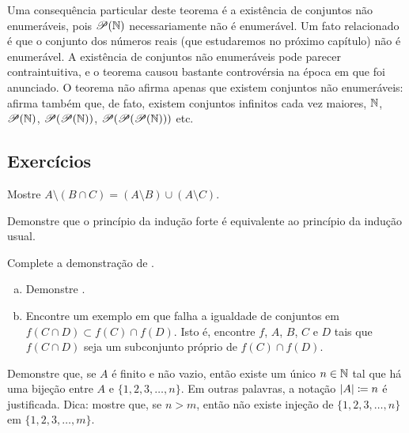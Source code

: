 Uma consequência particular deste teorema é a existência de conjuntos não
enumeráveis, pois ${\mathscr{P}}({\mathbb{N}})$ necessariamente não é enumerável.
Um fato relacionado é que
o conjunto dos números reais (que estudaremos no próximo capítulo) não é
enumerável.
A existência de conjuntos não enumeráveis pode parecer contraintuitiva, e o
teorema causou bastante controvérsia na época
em que foi anunciado. O teorema não afirma apenas que existem conjuntos não
enumeráveis: afirma também que, de fato, existem conjuntos infinitos cada vez
maiores,
${\mathbb{N}}$, ${\mathscr{P}}({\mathbb{N}})$,
${\mathscr{P}}({\mathscr{P}}({\mathbb{N}}))$, ${\mathscr{P}}({\mathscr{P}}({\mathscr{P}}({\mathbb{N}})))$ etc.


\subsection{Exercícios}

\begin{exercise}
Mostre
$A \setminus (B \cap C) = (A \setminus B) \cup (A \setminus C)$.
\end{exercise}

\begin{exercise}
Demonstre que o princípio da indução forte é equivalente ao princípio da
indução usual.
\end{exercise}

\begin{exercise}
Complete a demonstração de .
\end{exercise}

\begin{exercise}
\leavevmode
\begin{enumerate}[a)]
\item
Demonstre .
\item
Encontre um exemplo em que falha a igualdade de conjuntos
em
$f( C \cap D) \subset f (C) \cap f (D)$.
Isto é, encontre $f$, $A$, $B$, $C$ e $D$ tais que
$f( C \cap D)$ seja um subconjunto próprio de $f(C) \cap f(D)$.
\end{enumerate}
\end{exercise}

\begin{exercise}[Difícil]
Demonstre que, se $A$ é finito e não vazio, então existe um único
$n \in {\mathbb{N}}$ tal que há uma bijeção entre $A$ e $\{ 1, 2, 3, \ldots, n \}$.
Em outras palavras, a notação $\lvert {A} \rvert \coloneqq n$ é justificada.
Dica: mostre que, se $n > m$, então não existe injeção de
$\{ 1, 2, 3, \ldots, n \}$ em
$\{ 1, 2, 3, \ldots, m \}$.
\end{exercise}


